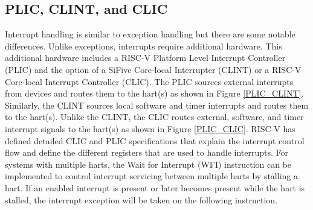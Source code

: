 \documentclass[12pt]{article}
\begin{document}
\subsection{PLIC, CLINT, and CLIC}
Interrupt handling is similar to exception handling but there are some notable differences. Unlike exceptions, interrupts require additional hardware. This additional hardware includes a RISC-V Platform Level Interrupt Controller (PLIC)\cite{PLIC} and the option of a SiFive Core-local Interrupter (CLINT)\cite{CLINT} or a RISC-V Core-local Interrupt Controller (CLIC)\cite{CLIC}. The PLIC sources external interrupts from devices and routes them to the hart(s) as shown in Figure \ref{PLIC_CLINT}. Similarly, the CLINT sources local software and timer interrupts and routes them to the hart(s). Unlike the CLINT, the CLIC routes external, software, and timer interrupt signals to the hart(s) as shown in Figure \ref{PLIC_CLIC}. RISC-V has defined detailed CLIC and PLIC specifications that explain the interrupt control flow and define the different registers that are used to handle interrupts. For systems with multiple harts, the Wait for Interrupt (WFI) instruction can be implemented to control interrupt servicing between multiple harts by stalling a hart. If an enabled interrupt is present or later becomes present while the hart is stalled, the interrupt exception will be taken on the following instruction.
\end{document}
